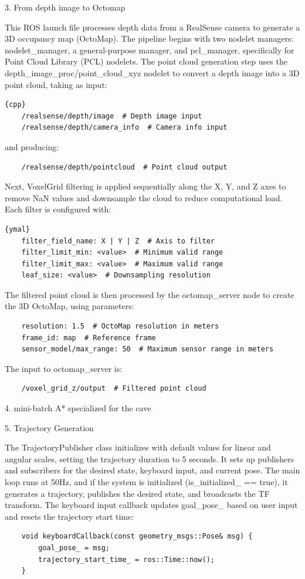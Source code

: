 \documentclass{article}
\begin{document}
3. From depth image to Octomap

This ROS launch file processes depth data from a RealSense camera to generate a 3D occupancy map (OctoMap). The pipeline begins with two nodelet managers: nodelet\_manager, a general-purpose manager, and pcl\_manager, specifically for Point Cloud Library (PCL) nodelets. The point cloud generation step uses the depth\_image\_proc/point\_cloud\_xyz nodelet to convert a depth image into a 3D point cloud, taking as input:

\begin{lstlisting}{cpp}
    /realsense/depth/image  # Depth image input
    /realsense/depth/camera_info  # Camera info input    
\end{lstlisting}
and producing:

\begin{lstlisting}
    /realsense/depth/pointcloud  # Point cloud output  
\end{lstlisting}

Next, VoxelGrid filtering is applied sequentially along the X, Y, and Z axes to remove NaN values and downsample the cloud to reduce computational load. Each filter is configured with:

\begin{lstlisting}{ymal}
    filter_field_name: X | Y | Z  # Axis to filter
    filter_limit_min: <value>  # Minimum valid range
    filter_limit_max: <value>  # Maximum valid range
    leaf_size: <value>  # Downsampling resolution
\end{lstlisting}

The filtered point cloud is then processed by the octomap\_server node to create the 3D OctoMap, using parameters:
\begin{lstlisting}
    resolution: 1.5  # OctoMap resolution in meters
    frame_id: map  # Reference frame
    sensor_model/max_range: 50  # Maximum sensor range in meters
    \end{lstlisting}

The input to octomap\_server is:
\begin{lstlisting}
    /voxel_grid_z/output  # Filtered point cloud
\end{lstlisting}

4. mini-batch A* specialized for the cave

5. Trajectory Generation

The TrajectoryPublisher class initializes with default values for linear and angular scales, setting the trajectory duration to 5 seconds. It sets up publishers and subscribers for the desired state, keyboard input, and current pose. The main loop runs at 50Hz, and if the system is initialized (is\_initialized\_ == true), it generates a trajectory, publishes the desired state, and broadcasts the TF transform. The keyboard input callback updates goal\_pose\_ based on user input and resets the trajectory start time:
\begin{lstlisting}
    void keyboardCallback(const geometry_msgs::Pose& msg) {
        goal_pose_ = msg;
        trajectory_start_time_ = ros::Time::now();
    }
\end{lstlisting}
\end{document}

